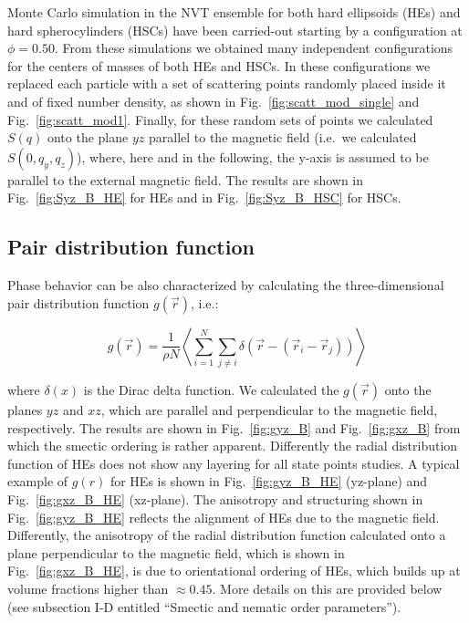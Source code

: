 \documentclass[aip,graphicx]{revtex4-1} %
\begin{document}
Monte Carlo simulation in the NVT ensemble for both hard ellipsoids (HEs) and hard spherocylinders (HSCs) have been carried-out 
starting by a configuration at $\phi = 0.50$.
From these simulations we obtained many independent configurations for the centers of masses of both HEs and HSCs. 
In these configurations we replaced each particle with a set of scattering points randomly placed inside it and 
of fixed number density, as shown in Fig.~\ref{fig:scatt_mod_single} and Fig.~\ref{fig:scatt_mod1}. 
Finally, for these random sets of points we calculated $S(q)$ onto the plane $yz$ parallel 
to the magnetic field (i.e.~we calculated $S(0, q_y, q_z)$), where, here and in the following,
the y-axis is assumed to be parallel to the external magnetic field.
The results are shown in Fig.~\ref{fig:Syz_B_HE} for HEs and in Fig.~\ref{fig:Syz_B_HSC} for HSCs.

\subsection{Pair distribution function}

Phase behavior can be also characterized by calculating the three-dimensional pair distribution function $g(\vec{r})$, i.e.:

\begin{equation}
    g(\vec{r}) = \frac{1}{\rho N} \left\langle \sum_{i=1}^N \sum_{j\neq i} \delta \left( \vec{r} - \left( \vec{r}_i - \vec{r}_j \right) \right) \right\rangle
\end{equation}

where $\delta(x)$ is the Dirac delta function. 
We calculated the $g(\vec{r})$ onto the planes $yz$ and $xz$, which are parallel and perpendicular to the magnetic field, respectively. 
The results are shown in Fig.~\ref{fig:gyz_B} and Fig.~\ref{fig:gxz_B} from which the smectic ordering is rather apparent.
Differently the radial distribution function of HEs does not show any
layering for all state points studies. A typical example of $g(r)$ for HEs is shown in Fig.~\ref{fig:gyz_B_HE} (yz-plane) and 
Fig.~\ref{fig:gxz_B_HE} (xz-plane). The anisotropy and structuring shown in Fig.~\ref{fig:gyz_B_HE} reflects the alignment 
of HEs due to the magnetic field. Differently, the anisotropy
of the radial distribution function calculated onto a plane perpendicular to the magnetic field, which is shown in 
Fig.~\ref{fig:gxz_B_HE}, is due to orientational ordering of HEs, which builds up at volume fractions higher than $\approx 0.45$.  
More details on this are provided below (see subsection I-D entitled ``Smectic and nematic order parameters'').
\end{document}
